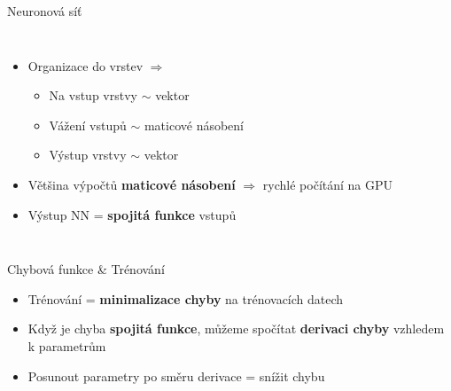 \begin{frame}{Neuronová síť}

    \begin{columns}

        \scalebox{.75}{}

        \begin{itemize}[<+->]

            \item Organizace do vrstev $\Rightarrow$

            \begin{itemize}[<+->]

                \item Na vstup vrstvy $\sim$ vektor

                \item Vážení vstupů $\sim$ maticové násobení

                \item Výstup vrstvy $\sim$ vektor

            \end{itemize}

        \item Většina výpočtů \textbf{maticové násobení} $\Rightarrow$ rychlé počítání
            na GPU

        \item Výstup NN = \textbf{spojitá funkce} vstupů

        \end{itemize}
    \end{columns}

\end{frame}


\begin{frame}{Chybová funkce \& Trénování}

    \begin{itemize}[<+->]

        \item Trénování = \textbf{minimalizace chyby} na trénovacích datech

        \item Když je chyba \textbf{spojitá funkce}, můžeme spočítat
            \textbf{derivaci chyby} vzhledem k parametrům

        \item Posunout parametry po směru derivace = snížit chybu

    \end{itemize}


\end{frame}

